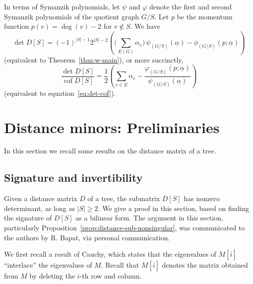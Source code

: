 \documentclass{amsart}
\theoremstyle{definition}
\DeclareMathOperator{\cof}{cof}
\newcommand{\trees}{\mathcal{F}_1}
\newcommand{\forests}{\mathcal{F}}
\newcommand{\degout}{\deg^o}
\begin{document}
In terms of Symanzik polynomials, let $\psi$ and $\varphi$ denote the first and second Symanzik polynomials of the quotient graph $G/S$.
Let $p$ be the momentum function $p(v) = \deg(v) - 2$ for $v \not \in S$.
We have
\begin{equation}
\label{eq:det-symanzik}
	\det D[S] = (-1)^{|S|-1} 2^{|S|-2} \left( \Big(\sum_{E(G)}\alpha_e \Big)\, \psi_{(G/S)}(\underline{\alpha}) - \phi_{(G/S)}(p; \underline{\alpha}) \right)
\end{equation}
(equivalent to Theorem~\ref{thm:w-main}),
or more succinctly,
\begin{equation}
\label{eq:det-cof-symanzik}
	\frac{\det D[S]}{\cof D[S]} = \frac12 \left( \sum_{e \in E} \alpha_e - \frac{\varphi_{(G/S)}(p; \underline{\alpha})}{\psi_{(G/S)}(\underline{\alpha})} \right)
\end{equation}
(equivalent to equation~\eqref{eq:det-cof}).

\section{Distance minors: Preliminaries}

In this section we recall some results on the distance matrix of a tree.

\subsection{Signature and invertibility}

Given a distance matrix $D$ of a tree,
the submatrix $D[S]$ has nonzero determinant, as long as $|S| \geq 2$.
We give a proof in this section, based on finding the signature of $D[S]$ as a bilinear form.
The argument in this section, particularly Proposition~\ref{prop:distance-sub-nonsingular}, was communicated to the authors by R. Bapat, via personal communication.

We first recall a result of Cauchy, which states that the eigenvalues of $M[\overline{i}]$ ``interlace'' the eigenvalues of $M$.
Recall that $M[\overline{i}]$ denotes the matrix obtained from $M$ by deleting the $i$-th row and column.
\end{document}
